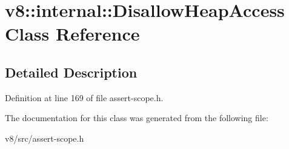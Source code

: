 \hypertarget{classv8_1_1internal_1_1DisallowHeapAccess}{}\section{v8\+:\+:internal\+:\+:Disallow\+Heap\+Access Class Reference}
\label{classv8_1_1internal_1_1DisallowHeapAccess}


\subsection{Detailed Description}


Definition at line 169 of file assert-\/scope.\+h.



The documentation for this class was generated from the following file\+:\begin{DoxyCompactItemize}
\item 
v8/src/assert-\/scope.\+h\end{DoxyCompactItemize}
